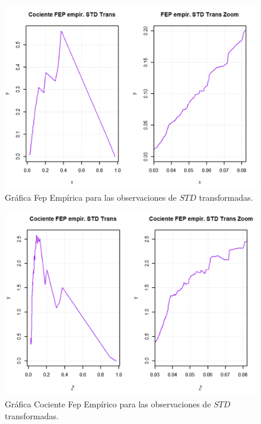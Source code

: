 \documentclass[10.5pt,notitlepage]{article}
\theoremstyle{plain}
\begin{document}
\begin{figure}[htb]
    \centering
    \includegraphics[scale = 0.4]{Incisob/FepSTDTrans.png}
    \caption{Gráfica Fep Empírica para las observaciones de \(STD\) transformadas. }
    \label{fig:10}
\end{figure}

\begin{figure}[htb]
    \centering
    \includegraphics[scale = 0.4]{Incisob/CocFepSTDTrans.png}
    \caption{Gráfica Cociente Fep Empírico para las observaciones de \(STD\) transformadas. }
    \label{fig:11}
\end{figure}
\end{document}
